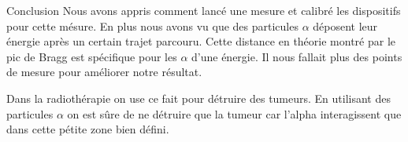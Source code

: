 \documentclass[a4paper,11pt,liststotocnumbered,bibtotocnumbered]{scrartcl}
\begin{document}

 
 \begin{section}{Conclusion}
  Nous avons appris comment lancé une mesure et calibré les dispositifs pour cette mésure. En plus nous avons vu que des particules $\alpha$ déposent leur énergie après un certain trajet parcouru. Cette distance en théorie montré par le pic de Bragg est spécifique pour les $\alpha$ d'une énergie. Il nous fallait plus des points de mesure pour améliorer notre résultat.
  
  Dans la radiothérapie on use ce fait pour détruire des tumeurs. En utilisant des particules $\alpha$ on est sûre de ne détruire que la tumeur car l'alpha interagissent que dans cette pétite zone bien défini.
 \end{section}
\end{document}
